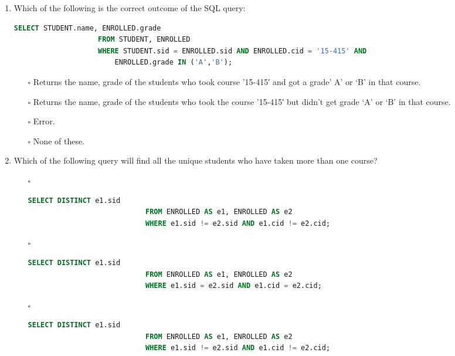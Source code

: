 \documentclass[10pt]{article}
\begin{document}
\begin{enumerate}
			\item Which of the following is the correct outcome of the SQL query: 
				\begin{lstlisting}[language=SQL,firstline=1, lastline=4]
					SELECT STUDENT.name, ENROLLED.grade 
					FROM STUDENT, ENROLLED 
					WHERE STUDENT.sid = ENROLLED.sid AND ENROLLED.cid = '15-415' AND 
						ENROLLED.grade IN ('A','B');
				\end{lstlisting}

				\begin{enumerate}
					\item[$\square$] Returns the name, grade of the students who took course ’15-415′ and got a grade’ A’ or ‘B’ in that course.
					\item[$\square$] Returns the name, grade of the students who took the course ’15-415′ but didn’t get grade ‘A’ or ‘B’ in that course.
					\item[$\square$] Error.
					\item[$\square$] None of these.
				\end{enumerate}

			\item Which of the following query will find all the unique students who have taken more than one course?
				\begin{enumerate}
					\item[$\square$] 
						\begin{lstlisting}[language=SQL,firstline=1, lastline=3, numbers = right] 
							SELECT DISTINCT e1.sid 
							FROM ENROLLED AS e1, ENROLLED AS e2 
							WHERE e1.sid != e2.sid AND e1.cid != e2.cid;
						\end{lstlisting}

					\item[$\square$] 
						\begin{lstlisting}[language=SQL,firstline=1, lastline=3, numbers = right] 
							SELECT DISTINCT e1.sid 
							FROM ENROLLED AS e1, ENROLLED AS e2 
							WHERE e1.sid = e2.sid AND e1.cid = e2.cid;
						\end{lstlisting}
					
					\item[$\square$] 
						\begin{lstlisting}[language=SQL,firstline=1, lastline=3, numbers = right] 
							SELECT DISTINCT e1.sid 
							FROM ENROLLED AS e1, ENROLLED AS e2 
							WHERE e1.sid != e2.sid AND e1.cid != e2.cid;
						\end{lstlisting}
					

\end{enumerate}
\end{enumerate}
\end{document}
